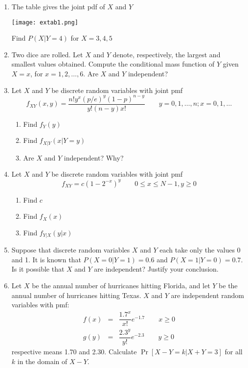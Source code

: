 \documentclass[../main.tex]{subfiles}
\begin{document}
\begin{exercises}
\begin{enumerate}
	\item %
	The table gives the joint pdf of $X$ and $Y$
	\begin{center}
		\texttt{[image: extab1.png]}
	\end{center}
	Find $P(X|Y=4)$ for $X=3,4,5$
	
	\item %
	
	 Two dice are rolled. Let $X$ and $Y$ denote,
	 respectively, the largest and
	smallest values obtained. Compute the conditional mass function of $Y$ given
	$X = x$, for $x = 1, 2, \ldots, 6$. Are $X$ and $Y$ independent?
	
	\item %
	Let $X$ and $Y$ be discrete random variables with joint pmf
	$$f_{XY}(x,y) = \dfrac{n! y^x(p/e)^y(1-p)^{n-y}}{y!(n-y)x!}
	\qquad y=0,1,\ldots,n; x=0,1,\ldots$$
	\begin{enumerate}
		\item Find $f_Y(y)$
		\item Find $f_{X|Y}(x|Y=y)$
		\item Are $X$ and $Y$ independent? Why?
	\end{enumerate}

	\item %
	Let $X$ and $Y$ be discrete random variables with joint pmf
	$$f_{XY} = c(1-2^{-x})^y\qquad 0\leq x \leq N-1, y\geq 0$$
	\begin{enumerate}
		\item Find $c$
		\item Find $f_X(x)$
		\item Find $f_{Y|X}(y|x)$
	\end{enumerate}

	\item %
	Suppose that discrete random variables $X$ and $Y$ each take only the values 0
	and 1. It is known that $P(X = 0|Y = 1) = 0.6$ and $P(X = 1|Y = 0) = 0.7$.
	Is it possible that $X$ and $Y$ are independent? Justify your conclusion.
	
	\item %
	Let $X$ be the annual number of hurricanes hitting Florida, and let $Y$ be
	the annual number of hurricanes hitting Texas. $X$ and $Y$ are independent
	random variables with pmf:
	\begin{eqnarray*}
		f(x) &=& \dfrac{1.7^x}{x!}e^{-1.7} \qquad x\geq 0 \\
		g(y) &=& \dfrac{2.3^y}{y!}e^{-2.3} \qquad y\geq 0
	\end{eqnarray*}
	respective means 1.70 and 2.30.
	Calculate $\Pr[X − Y=k |X + Y = 3]$ for all $k$ in the 
	domain of $X-Y$.
	

\end{enumerate}
\end{exercises}
\end{document}
